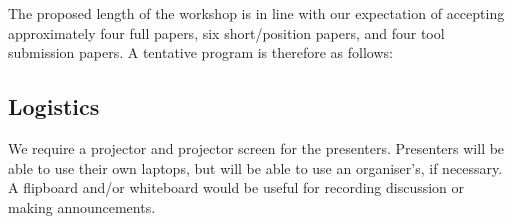 \documentclass[10pt,conference]{IEEEtran}
\newcommand{\TODO}[1]{\textbf{\textcolor{ScarletRed}{[TODO: #1]}}\xspace}
\newcommand{\TODO}[1]{}
\begin{document}
The proposed length of the workshop is in line with our expectation of
accepting approximately four full papers, six short/position papers,
and four tool submission papers.
A tentative program is therefore as follows:

\vspace{0.05in}

{\small
{}}	


\subsection{Logistics}

We require a projector and projector screen for the
presenters. Presenters will be able to use their own laptops, but will
be able to use an organiser's, if necessary. A flipboard and/or
whiteboard would be useful for recording discussion or making
announcements.
\end{document}
